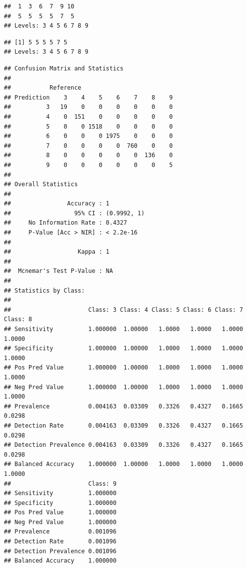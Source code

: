 \documentclass[
]{book}
\newenvironment{Shaded}{\begin{snugshade}}{\end{snugshade}}
\newcommand{\CommentTok}[1]{\textcolor[rgb]{0.56,0.35,0.01}{\textit{#1}}}
\newcommand{\FunctionTok}[1]{\textcolor[rgb]{0.00,0.00,0.00}{#1}}
\newcommand{\NormalTok}[1]{#1}
\newcommand{\SpecialCharTok}[1]{\textcolor[rgb]{0.00,0.00,0.00}{#1}}
\begin{document}
\begin{verbatim}
##  1  3  6  7  9 10 
##  5  5  5  5  7  5 
## Levels: 3 4 5 6 7 8 9
\end{verbatim}

\begin{Shaded}
\end{Shaded}

\begin{verbatim}
## [1] 5 5 5 5 7 5
## Levels: 3 4 5 6 7 8 9
\end{verbatim}

\begin{Shaded}
\end{Shaded}

\begin{verbatim}
## Confusion Matrix and Statistics
## 
##           Reference
## Prediction    3    4    5    6    7    8    9
##          3   19    0    0    0    0    0    0
##          4    0  151    0    0    0    0    0
##          5    0    0 1518    0    0    0    0
##          6    0    0    0 1975    0    0    0
##          7    0    0    0    0  760    0    0
##          8    0    0    0    0    0  136    0
##          9    0    0    0    0    0    0    5
## 
## Overall Statistics
##                                      
##                Accuracy : 1          
##                  95% CI : (0.9992, 1)
##     No Information Rate : 0.4327     
##     P-Value [Acc > NIR] : < 2.2e-16  
##                                      
##                   Kappa : 1          
##                                      
##  Mcnemar's Test P-Value : NA         
## 
## Statistics by Class:
## 
##                      Class: 3 Class: 4 Class: 5 Class: 6 Class: 7 Class: 8
## Sensitivity          1.000000  1.00000   1.0000   1.0000   1.0000   1.0000
## Specificity          1.000000  1.00000   1.0000   1.0000   1.0000   1.0000
## Pos Pred Value       1.000000  1.00000   1.0000   1.0000   1.0000   1.0000
## Neg Pred Value       1.000000  1.00000   1.0000   1.0000   1.0000   1.0000
## Prevalence           0.004163  0.03309   0.3326   0.4327   0.1665   0.0298
## Detection Rate       0.004163  0.03309   0.3326   0.4327   0.1665   0.0298
## Detection Prevalence 0.004163  0.03309   0.3326   0.4327   0.1665   0.0298
## Balanced Accuracy    1.000000  1.00000   1.0000   1.0000   1.0000   1.0000
##                      Class: 9
## Sensitivity          1.000000
## Specificity          1.000000
## Pos Pred Value       1.000000
## Neg Pred Value       1.000000
## Prevalence           0.001096
## Detection Rate       0.001096
## Detection Prevalence 0.001096
## Balanced Accuracy    1.000000
\end{verbatim}
\end{document}
